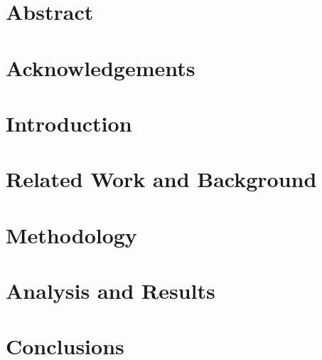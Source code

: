 \documentclass[12pt]{report}
\begin{document}

\chapter*{Abstract}
    
    
    
\chapter*{Acknowledgements}
    


\tableofcontents

    


\chapter{Introduction}
    

    
\chapter{Related Work and Background}
    
    
    
\chapter{Methodology}
    
    

\chapter{Analysis and Results}
    
    
    
\chapter{Conclusions}
    


\appendix
    
    
    
\printbibliography %
    
\end{document}
